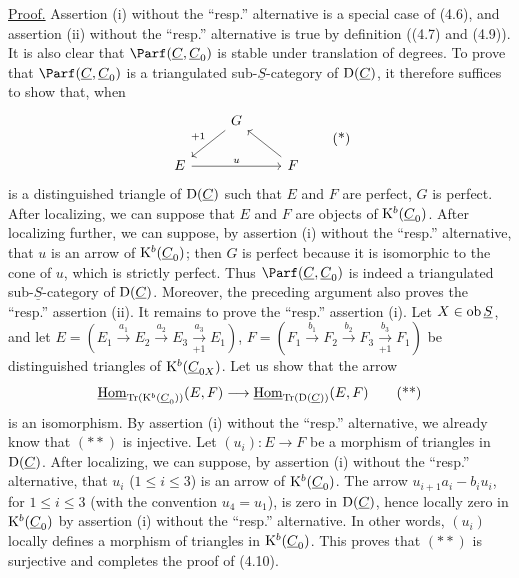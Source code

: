 \uline{Proof.} Assertion (i) without the ``resp.'' alternative is a special case of (4.6), and assertion (ii) without the ``resp.'' alternative is true by definition ((4.7) and (4.9)). It is also clear that \(\Parf(\underline{C},\underline{C}_0)\) is stable under translation of degrees. To prove that \(\Parf(\underline{C},\underline{C}_0)\) is a triangulated sub-\(\underline{S}\)-category of \(\mathrm D(\underline{C})\), it therefore suffices to show that, when
\[
\begin{tikzcd}
& G \arrow[dl,"+1"'] & \\
E \arrow[rr,"u"] && F \arrow[ul]
\end{tikzcd}
\tag{*}
\]
is a distinguished triangle of \(\mathrm D(\underline{C})\) such that \(E\) and \(F\) are perfect, \(G\)
%
is perfect. After localizing, we can suppose that \(E\) and \(F\) are objects of \(\mathrm K^b(\underline{C}_0)\). After localizing further, we can suppose, by assertion (i) without the ``resp.'' alternative, that \(u\) is an arrow of \(\mathrm K^b(\underline{C}_0)\); then \(G\) is perfect because it is isomorphic to the cone of \(u\), which is strictly perfect. Thus \(\Parf(\underline{C},\underline{C}_0)\) is indeed a triangulated sub-\(\underline{S}\)-category of \(\mathrm D(\underline{C})\). Moreover, the preceding argument also proves the ``resp.'' assertion (ii). It remains to prove the ``resp.'' assertion (i). Let \(X\in\operatorname{ob} \underline{S}\), and let \(E=(E_1\xrightarrow{a_1}E_2\xrightarrow{a_2}E_3\xrightarrow[+1]{a_3}E_1)\), \(F=(F_1\xrightarrow{b_1}F_2\xrightarrow{b_2}F_3\xrightarrow[+1]{b_3}F_1)\) be distinguished triangles of \(\mathrm K^b(\underline{C}_{0X})\). Let us show that the arrow
\[
  \underline{\operatorname{Hom}}_{\operatorname{Tr}(\mathrm K^b(\underline{C}_0))}(E,F)
  \longrightarrow
  \underline{\operatorname{Hom}}_{\operatorname{Tr}(\mathrm D(\underline{C}))}(E,F)
  \tag{**}
\]
is an isomorphism. By assertion (i) without the ``resp.'' alternative, we already know that \((**)\) is injective. Let \((u_i):E\to F\) be a morphism of triangles in \(\mathrm D(\underline{C})\). After localizing, we can suppose, by assertion (i) without the ``resp.'' alternative, that \(u_i\) (\(1\leq i\leq3\)) is an arrow of \(\mathrm K^b(\underline{C}_0)\). The arrow \(u_{i+1}a_i-b_iu_i\), for \(1\leq i\leq3\) (with the convention \(u_4=u_1\)), is zero in \(\mathrm D(\underline{C})\), hence locally zero in \(\mathrm K^b(\underline{C}_0)\) by assertion (i) without the ``resp.'' alternative. In other words, \((u_i)\) locally defines a morphism of triangles in \(\mathrm K^b(\underline{C}_0)\). This proves that \((**)\) is surjective and completes the proof of (4.10).

